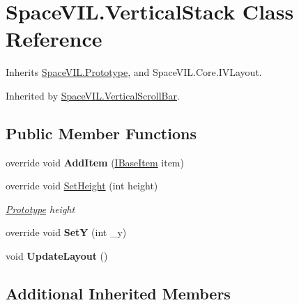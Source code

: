 \hypertarget{class_space_v_i_l_1_1_vertical_stack}{}\section{Space\+V\+I\+L.\+Vertical\+Stack Class Reference}
\label{class_space_v_i_l_1_1_vertical_stack}


Inherits \mbox{\hyperlink{class_space_v_i_l_1_1_prototype}{Space\+V\+I\+L.\+Prototype}}, and Space\+V\+I\+L.\+Core.\+I\+V\+Layout.



Inherited by \mbox{\hyperlink{class_space_v_i_l_1_1_vertical_scroll_bar}{Space\+V\+I\+L.\+Vertical\+Scroll\+Bar}}.

\subsection*{Public Member Functions}
\begin{DoxyCompactItemize}
\item 
\mbox{\label{class_space_v_i_l_1_1_vertical_stack_ada632b0ed9e6e9518c8f0054eb0be1ce}} 
override void {\bfseries Add\+Item} (\mbox{\hyperlink{interface_space_v_i_l_1_1_core_1_1_i_base_item}{I\+Base\+Item}} item)
\item 
override void \mbox{\hyperlink{class_space_v_i_l_1_1_vertical_stack_a1e2360b005a6fb8e503dc60d27f1f021}{Set\+Height}} (int height)
\begin{DoxyCompactList}\small\item\em \mbox{\hyperlink{class_space_v_i_l_1_1_prototype}{Prototype}} height \end{DoxyCompactList}\item 
\mbox{\label{class_space_v_i_l_1_1_vertical_stack_a01db47bbec9d8b0629b0c40c51a81710}} 
override void {\bfseries SetY} (int \+\_\+y)
\item 
\mbox{\label{class_space_v_i_l_1_1_vertical_stack_a5d72bb6cbbe27b498e62bc1c9ff02c2c}} 
void {\bfseries Update\+Layout} ()
\end{DoxyCompactItemize}
\subsection*{Additional Inherited Members}


